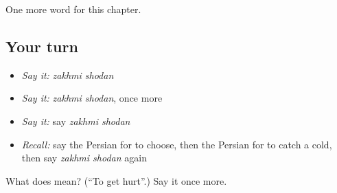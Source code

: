 \begin{grammarlens}[title={What you've built}]
One more word for this chapter.
\end{grammarlens}

\subsection*{Your turn}
\begin{itemize}
\raggedright
  \item \emph{Say it:} \emph{zakhmi shodan}
  \item \emph{Say it:} \emph{zakhmi shodan}, once more
  \item \emph{Say it:} say \emph{zakhmi shodan}
  \item \emph{Recall:} say the Persian for to choose, then the Persian for to catch a cold, then say \emph{zakhmi shodan} again
\end{itemize}

\begin{tcolorbox}[breakable,colback=teal!4,colframe=teal!35!black,title={Before you move on}]
What does   mean? (\textquotedblleft{}To get hurt\textquotedblright{}.) Say it once more.
\end{tcolorbox}
